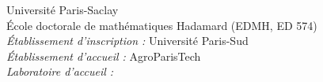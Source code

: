 \documentclass[a4paper,12pt]{article}
\begin{document}
\begin{center}
 {\large\sc Universit\'e Paris-Saclay}\\
  \vspace*{0.2cm}
\'Ecole doctorale de math\'ematiques Hadamard (EDMH, ED 574)\\  
 \vspace*{0.4cm} 
{\small \it \'Etablissement d'inscription : } 
    Universit\'e Paris-Sud\\
 \vspace*{0.2cm} 
{\small \it \'Etablissement d'accueil : }    
    AgroParisTech\\
\vspace*{0.2cm} 
{\small \it Laboratoire d'accueil : }     

\end{center}
\end{document}

